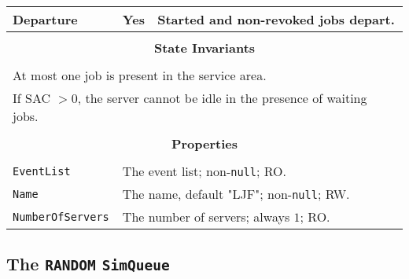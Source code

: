 \documentclass[12pt]{book}
\begin{document}
\begin{tabular}{|l|l|l|}
Departure & Yes & Started and non-revoked jobs depart. \\
\hline
\multicolumn{3}{|c|}{} \\
\multicolumn{3}{|c|}{\bf State  Invariants} \\
\multicolumn{3}{|c|}{} \\
\hline
\multicolumn{3}{|l|}{At most one job is present in the service area.} \\
\multicolumn{3}{|l|}{If SAC $> 0$, the server cannot be idle in the presence of waiting jobs.} \\
\hline
\multicolumn{3}{|c|}{} \\
\multicolumn{3}{|c|}{\bf Properties} \\
\multicolumn{3}{|c|}{} \\
\hline
\lstinline|EventList|       & \multicolumn{2}{|l|}{The event list; non-\lstinline|null|; RO.} \\
\hline
\lstinline|Name|            & \multicolumn{2}{|l|}{The name, default "LJF"; non-\lstinline|null|; RW.} \\
\hline
\lstinline|NumberOfServers| & \multicolumn{2}{|l|}{The number of servers; always $1$; RO.} \\
\hline
\end{tabular}

\subsection{The \lstinline{RANDOM} \lstinline{SimQueue}}
\end{document}
